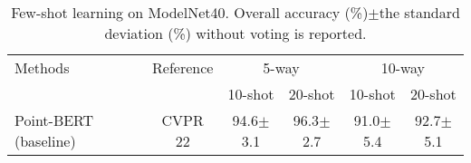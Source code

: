 \begin{table}[!t]
  \centering
  \scriptsize
    \setlength{\tabcolsep}{0.7mm}
  \caption{Few-shot learning on ModelNet40\cite{wu20153d}. Overall accuracy (\%)$\pm$the standard deviation (\%) without voting is reported.}
    \begin{tabular}{lccccc}
    \toprule
   \multirow{2.3}{*}{Methods}&\multirow{2.3}{*}{Reference} & \multicolumn{2}{c}{5-way} & \multicolumn{2}{c}{10-way} \\
\cmidrule{3-6}  &        & 10-shot & 20-shot & 10-shot & 20-shot \\
    \midrule
   Point-BERT~\cite{yu2022point} (baseline) & CVPR 22 &94.6$\pm$3.1 & 96.3$\pm$2.7 & 91.0$\pm$5.4 & 92.7$\pm$5.1 \\

\end{tabular}
\end{table}
